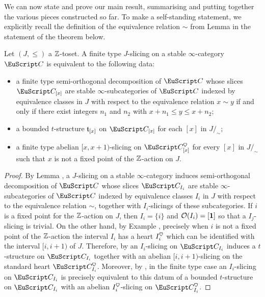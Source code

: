 {We can now state and prove our main result, summarising and putting together the various pieces constructed so far. To make a self-standing statement, we explicitly recall the definition of the equivalence relation $\sim$ from Lemma  in the statement of the theorem below.
\begin{theorem}\label{conclusion}
Let $(J,\leq)$ a $\mathbb{Z}$-toset. A finite type $J$-slicing on a stable $\infty$-category $\C$ is equivalent to the following data:
\begin{itemize}
\item a finite type semi-orthogonal decomposition of $\C$ whose slices $\C_{[x]}$ are stable  $\infty$-subcategories of $\C$ indexed by equivalence classes in $J$ with respect to the equivalence relation $x\sim y$ if and only if there exist integers $n_1$ and $n_2$ with $x+n_1\leq y\leq x+n_2$;
\item a bounded $t$-structure $\mathfrak{t}_{[x]}$ on $\C_{[x]}$ for each  $[x]$ in $J/_{\!\sim}$;
\item a finite type abelian $[x,x+1)$-slicing on $\C_{[x]}^\heart$ for every $[x]$ in $J/_{\!\sim}$ such that $x$ is not a fixed point of the $\mathbb{Z}$-action on $J$.
\end{itemize}
\end{theorem}
\begin{proof}
By Lemma , a $J$-slicing on a stable $\infty$-category induces semi-orthogonal decomposition of $\C$ whose slices $\C_{I_i}$ are stable  $\infty$-subcategories of $\C$ indexed by equivalence classes $I_i$ in $J$ with respect to the equivalence relation $\sim$, together with $I_i$-slicings of these subcategories.
If $i$ is a fixed point for the $\mathbb{Z}$-action on $J$, then $I_i=\{i\}$ and $\mathcal{O}(I_i)=[\mathbf{1}]$ so that a $I_j$-slicing is trivial. On the other hand, by Example , precisely when $i$ is not a fixed point of the $\mathbb{Z}$-action the interval $I_i$ has a heart $I_i^\heart$ which can be identified with the interval $[i,i+1)$ of $J$. Therefore, by \aprop{} an $I_i$-slicing on $\C_{I_i}$ induces a $t$-structure on $\C_{I_i}$ together with an abelian $[i,i+1)$-slicing on the standard heart $\C_{I_i}^\heart$. Moreover, by \aprop{}, in the finite type case an $I_i$-slicing on $\C_{I_i}$ is precisely equivalent to this datum of a bounded $t$-structure on $\C_{I_i}$ with an abelian $I_i^\heart$-slicing on $\C_{I_i}^\heart$. 
\end{proof}
}








